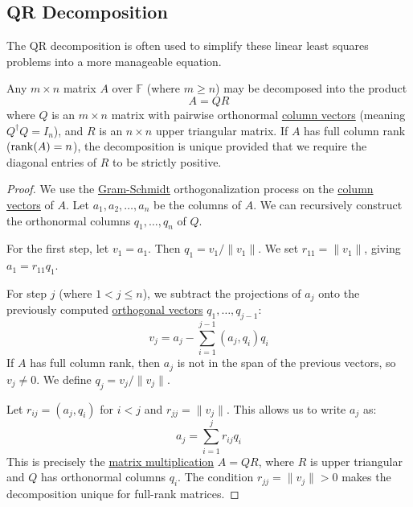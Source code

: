 \subsection{QR Decomposition} 

  The QR decomposition is often used to simplify these linear least squares problems into a more manageable equation. 

  \begin{definition}[QR Decomposition]
    \label{def:qr-decomposition}
    Any $m \times n$ matrix $A$ over $\mathbb{F}$ (where $m \geq n$) may be decomposed into the product
    \begin{equation}
      A = QR
    \end{equation}
    where $Q$ is an $m \times n$ matrix with pairwise orthonormal \hyperref[def:column-vector]{column vectors} (meaning $Q^\dagger Q = I_n$), and $R$ is an $n \times n$ upper triangular matrix. If $A$ has full column rank ($\operatorname{rank}(A) = n$), the decomposition is unique provided that we require the diagonal entries of $R$ to be strictly positive. 
  \end{definition}
  \begin{proof}
    We use the \hyperref[thm:gram-schmidt]{Gram-Schmidt} orthogonalization process on the \hyperref[def:column-vector]{column vectors} of $A$. Let $a_1, a_2, \dots, a_n$ be the columns of $A$. We can recursively construct the orthonormal columns $q_1, \dots, q_n$ of $Q$. 
    
    For the first step, let $v_1 = a_1$. Then $q_1 = v_1 / \|v_1\|$. We set $r_{11} = \|v_1\|$, giving $a_1 = r_{11} q_1$. 

    For step $j$ (where $1 < j \leq n$), we subtract the projections of $a_j$ onto the previously computed \hyperref[def:orthogonal-vectors]{orthogonal vectors} $q_1, \dots, q_{j-1}$:
    \begin{equation}
      v_j = a_j - \sum_{i=1}^{j-1} (a_j, q_i) q_i
    \end{equation}
    If $A$ has full column rank, then $a_j$ is not in the span of the previous vectors, so $v_j \neq 0$. We define $q_j = v_j / \|v_j\|$. 

    Let $r_{ij} = (a_j, q_i)$ for $i < j$ and $r_{jj} = \|v_j\|$. This allows us to write $a_j$ as:
    \begin{equation}
      a_j = \sum_{i=1}^j r_{ij} q_i
    \end{equation}
    This is precisely the \hyperref[def:matrix-multiplication]{matrix multiplication} $A = QR$, where $R$ is upper triangular and $Q$ has orthonormal columns $q_i$. The condition $r_{jj} = \|v_j\| > 0$ makes the decomposition unique for full-rank matrices.
  \end{proof}

